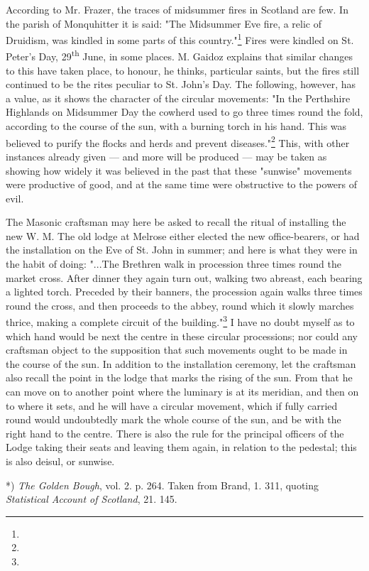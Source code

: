 \documentclass[a4paper, 11pt, oneside, polutonikogreek, english]{article}
\begin{document}
According to Mr. Frazer, the traces of midsummer fires in Scotland are few. In the parish of Monquhitter it is said: "The Midsummer Eve fire, a relic of Druidism, was kindled in some parts of this country."\footnote{} Fires were kindled on St. Peter's Day, 29\textsuperscript{th} June, in some places. M. Gaidoz explains that similar changes to this have taken place, to honour, he thinks, particular saints, but the fires still continued to be the rites peculiar to St. John's Day. The following, however, has a value, as it shows the character of the circular movements: "In the Perthshire Highlands on Midsummer Day the cowherd used to go three times round the fold, according to the course of the sun, with a burning torch in his hand. This was believed to purify the flocks and herds and prevent diseases."\footnote{} This, with other instances already given --- and more will be produced --- may be taken as showing how widely it was believed in the past that these "sunwise" movements were productive of good, and at the same time were obstructive to the powers of evil.

The Masonic craftsman may here be asked to recall the ritual of installing the new W. M. The old lodge at Melrose either elected the new office-bearers, or had the installation on the Eve of St. John in summer; and here is what they were in the habit of doing: "...The Brethren walk in procession three times round the market cross. After dinner they again turn out, walking two abreast, each bearing a lighted torch. Preceded by their banners, the procession again walks three times round the cross, and then proceeds to the abbey, round which it slowly marches thrice, making a complete circuit of the building."\footnote{} I have no doubt myself as to which hand would be next the centre in these circular processions; nor could any craftsman object to the supposition that such movements ought to be made in the course of the sun. In addition to the installation ceremony, let the craftsman also recall the point in the lodge that marks the rising of the sun. From that he can move on to another point where the luminary is at its meridian, and then on to where it sets, and he will have a circular movement, which if fully carried round would undoubtedly mark the whole course of the sun, and be with the right hand to the centre. There is also the rule for the principal officers of the Lodge taking their seats and leaving them again, in relation to the pedestal; this is also deisul, or sunwise.

*) \emph{The Golden Bough}, vol. 2. p. 264. Taken from Brand, 1. 311, quoting \emph{Statistical Account of Scotland}, 21. 145.
\end{document}
